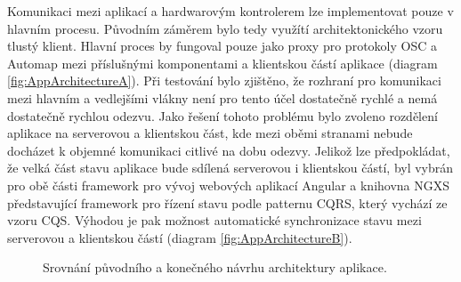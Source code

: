 \documentclass[thesis=M,czech]{FITthesis}[2019/03/06]
\begin{document}
		Komunikaci mezi aplikací a hardwarovým kontrolerem lze implementovat pouze v hlavním procesu. Původním záměrem bylo tedy využítí architektonického vzoru tlustý klient. 
		Hlavní proces by fungoval pouze jako proxy pro protokoly OSC a Automap mezi příslušnými komponentami a klientskou částí aplikace (diagram \ref{fig:AppArchitectureA}).
		Při testování bylo zjištěno, že rozhraní pro komunikaci mezi hlavním a vedlejšími vlákny není pro tento účel dostatečně rychlé a nemá dostatečně rychlou odezvu.
		Jako řešení tohoto problému bylo zvoleno rozdělení aplikace na serverovou a klientskou část, kde mezi oběmi stranami nebude docházet k objemné komunikaci citlivé na dobu odezvy.
		Jelikož lze předpokládat, že velká část stavu aplikace bude sdílená serverovou i klientskou částí, byl vybrán pro obě části framework pro vývoj webových aplikací Angular a knihovna NGXS představující framework pro řízení stavu podle patternu CQRS\cite{cqrs}, který vychází ze vzoru CQS\cite{cqs}. Výhodou je pak možnost automatické synchronizace stavu mezi serverovou a klientskou částí (diagram \ref{fig:AppArchitectureB}).
		



		\begin{figure}
			\centering		
			\qquad
			\caption{Srovnání původního a konečného návrhu architektury aplikace.}
			\label{fig:AppArchitecture}
		\end{figure}
		
\end{document}
